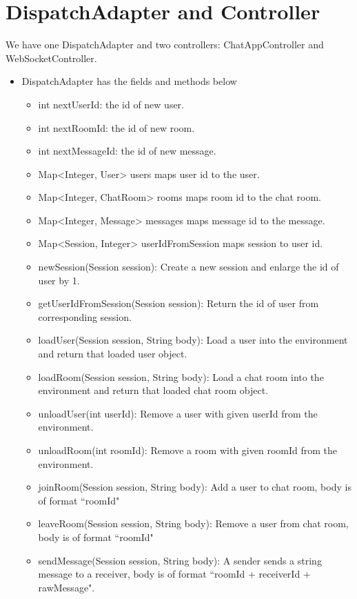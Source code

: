 \documentclass[letterpaper, 11pt]{article}
\begin{document}
\section{DispatchAdapter and Controller}
We have one DispatchAdapter and two controllers: ChatAppController and WebSocketController. 

\begin{itemize}
\item DispatchAdapter has the fields and methods below
\begin{itemize}
\item int nextUserId: the id of new user.
\item int nextRoomId: the id of new room.
\item int nextMessageId: the id of new message.
\item Map<Integer, User> users maps user id to the user.
\item Map<Integer, ChatRoom> rooms maps room id to the chat room. 
\item Map<Integer, Message> messages maps message id to the message. 
\item Map<Session, Integer> userIdFromSession maps session to user id. 
\item newSession(Session session): Create a new session and enlarge the id of user by 1.
\item getUserIdFromSession(Session session): Return the id of user from corresponding session.
\item loadUser(Session session, String body): Load a user into the environment and return that loaded user object.
\item loadRoom(Session session, String body): Load a chat room into the environment and return that loaded chat room object.
\item unloadUser(int userId): Remove a user with given userId from the environment.
\item unloadRoom(int roomId): Remove a room with given roomId from the environment.
\item joinRoom(Session session, String body): Add a user to chat room, body is of format ``roomId"
\item leaveRoom(Session session, String body): Remove a user from chat room, body is of format ``roomId"
\item sendMessage(Session session, String body): A sender sends a string message to a receiver, body is of format ``roomId + receiverId + rawMessage".

\end{itemize}
\end{itemize}
\end{document}
